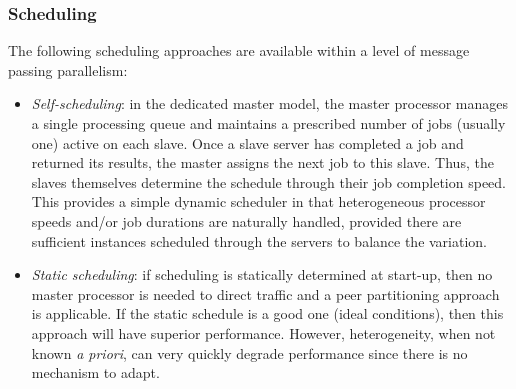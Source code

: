 \subsubsection{Scheduling}\label{parallel:SLP:message:sched}

The following scheduling approaches are available within a level of
message passing parallelism:

\begin{itemize}
\item \emph{Self-scheduling}: in the dedicated master model, the master
  processor manages a single processing queue and maintains a
  prescribed number of jobs (usually one) active on each slave. Once a
  slave server has completed a job and returned its results, the
  master assigns the next job to this slave. Thus, the slaves
  themselves determine the schedule through their job completion
  speed. This provides a simple dynamic scheduler in that
  heterogeneous processor speeds and/or job durations are naturally
  handled, provided there are sufficient instances scheduled through
  the servers to balance the variation.

\item \emph{Static scheduling}: if scheduling is statically determined
  at start-up, then no master processor is needed to direct traffic
  and a peer partitioning approach is applicable. If the static
  schedule is a good one (ideal conditions), then this approach will
  have superior performance. However, heterogeneity, when not known
  \emph{a priori}, can very quickly degrade performance since there is
  no mechanism to adapt.
\end{itemize}


